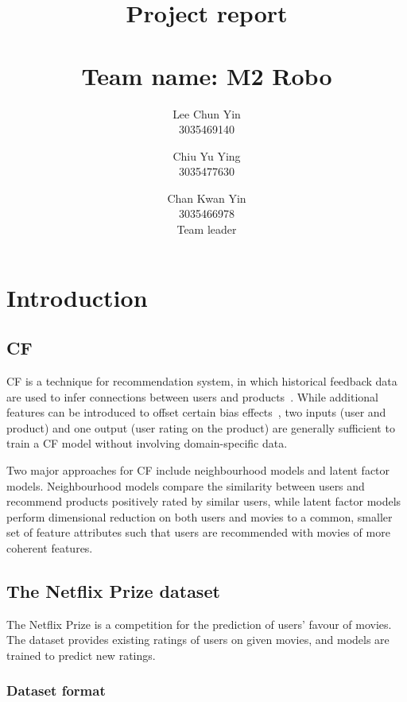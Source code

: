 \documentclass[final]{cvpr}
\begin{document}
\title{
	Project report \\~\\
	\large{Team name: M2 Robo}
}

\author{
	Lee Chun Yin\\
	3035469140\\
	\and
	Chiu Yu Ying\\
	3035477630
	\and
	Chan Kwan Yin\\
	3035466978 \\
	Team leader
}

\maketitle

\clearpage

\section{Introduction}
\subsection{\ac{CF}}
\ac{CF} is a technique for recommendation system,
in which historical feedback data are used to infer connections between users and products~\cite{FactorMeet}.
While additional features can be introduced to offset certain bias effects~\cite{BellKor2008},
two inputs (user and product) and one output (user rating on the product) are generally sufficient
to train a \ac{CF} model without involving domain-specific data.

Two major approaches for \ac{CF} include neighbourhood models and latent factor models.
Neighbourhood models compare the similarity between users
and recommend products positively rated by similar users,
while latent factor models perform dimensional reduction on both users and movies
to a common, smaller set of feature attributes such that
users are recommended with movies of more coherent features.

\subsection{The Netflix Prize dataset}
The Netflix Prize is a competition for the prediction of users' favour of movies.
The dataset provides existing ratings of users on given movies,
and models are trained to predict new ratings.

\subsubsection{Dataset format}
\end{document}
